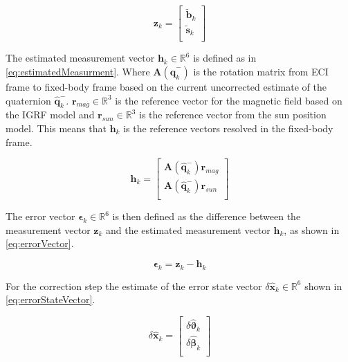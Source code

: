 \begin{equation}\label{eq:measurment}
	\boldsymbol{z}_k = \begin{bmatrix}
		\tilde{\boldsymbol{b}}_k \\
		\tilde{\boldsymbol{s}}_k \\
	\end{bmatrix}
\end{equation}  

The estimated measurement vector $\boldsymbol{h}_k \in \mathbb{R}^{6}$ is defined as in \autoref{eq:estimatedMeasurment}. Where $\boldsymbol{A}(\hat{\boldsymbol{q}}^-_k)$ is the rotation matrix from ECI frame to fixed-body frame based on the current uncorrected estimate of the quaternion $\hat{\boldsymbol{q}}^-_k$. $\boldsymbol{r}_{mag} \in \mathbb{R}^{3}$ is the reference vector for the magnetic field based on the IGRF model and $\boldsymbol{r}_{sun} \in \mathbb{R}^{3}$ is the reference vector from the sun position model. This means that $\boldsymbol{h}_k$ is the reference vectors resolved in the fixed-body frame.   

\begin{equation}\label{eq:estimatedMeasurment}
	\boldsymbol{h}_k = \begin{bmatrix}
		\boldsymbol{A}(\hat{\boldsymbol{q}}^-_k)\boldsymbol{r}_{mag} \\
		\boldsymbol{A}(\hat{\boldsymbol{q}}^-_k)\boldsymbol{r}_{sun} \\
	\end{bmatrix}
\end{equation}

The error vector $\boldsymbol{\epsilon}_k \in \mathbb{R}^{6}$ is then defined as the difference between the measurement vector $\boldsymbol{z}_k$ and the estimated measurement vector $\boldsymbol{h}_k$, as shown in \autoref{eq:errorVector}. 

\begin{equation}\label{eq:errorVector}
	\boldsymbol{\epsilon}_k = \boldsymbol{z}_k - \boldsymbol{h}_k
\end{equation}  

For the correction step the estimate of the error state vector $\delta\hat{\boldsymbol{x}}_k \in \mathbb{R}^{6}$ shown in \autoref{eq:errorStateVector}.       

\begin{equation}\label{eq:errorStateVector}
	\delta\hat{\boldsymbol{x}}_k = \begin{bmatrix}
		\delta\hat{\boldsymbol{\vartheta}}_k \\
		\delta\hat{\boldsymbol{\beta}}_k \\
	\end{bmatrix}
\end{equation} 

